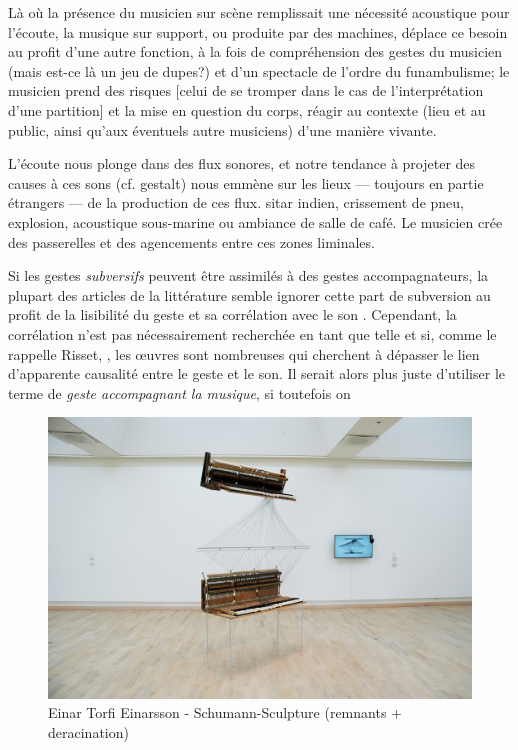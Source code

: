 
Là où la présence du musicien sur scène remplissait une nécessité acoustique pour l’écoute, la musique sur support, ou produite par des machines, déplace ce besoin au profit d’une autre fonction, à la fois de compréhension des gestes du musicien (mais est-ce là un jeu de dupes?) et d’un spectacle de l’ordre du funambulisme; le musicien prend des risques [celui de se tromper dans le cas de l’interprétation d’une partition] et la mise en question du corps, réagir au contexte (lieu et au public, ainsi qu’aux éventuels autre musiciens) d’une manière vivante.

L’écoute nous plonge dans des flux sonores, et notre tendance à projeter des causes à ces sons (cf. gestalt) nous emmène sur les lieux — toujours en partie étrangers — de la production de ces flux. sitar indien, crissement de pneu, explosion, acoustique sous-marine ou ambiance de salle de café.
Le musicien crée des passerelles et des agencements entre ces zones liminales.


Si les gestes \textit{subversifs} peuvent être assimilés à des gestes accompagnateurs, la plupart des articles de la littérature semble ignorer cette part de subversion au profit de la lisibilité du geste et sa corrélation avec le son \cite{godoy_exploring_2006}.
Cependant, la corrélation n'est pas nécessairement recherchée en tant que telle et si, comme le rappelle Risset,  \cite{risset_propos_2010}, les œuvres sont nombreuses qui cherchent à dépasser le lien d'apparente causalité entre le geste et le son. 
Il serait alors plus juste d'utiliser le terme de \textit{geste accompagnant la musique}, si toutefois on 

\begin{figure}[!htbp]
	\includegraphics[width=\textwidth]{gfx/Einarson-SchumannSculpture}
	\caption{Einar Torfi Einarsson - Schumann-Sculpture (remnants + deracination)}
	\label{fig:gesture:einarsson}
\end{figure}



